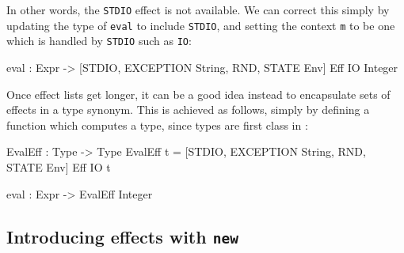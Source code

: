 \noindent
In other words, the \texttt{STDIO} effect is not available. We can correct
this simply by updating the type of \texttt{eval} to include \texttt{STDIO},
and setting the context \texttt{m} to be one which is handled by \texttt{STDIO}
such as \texttt{IO}:

\begin{code}
eval : Expr -> { [STDIO, EXCEPTION String, RND, STATE Env] } Eff IO Integer
\end{code}

\noindent
Once effect lists get longer, it can be a good idea instead
to encapsulate sets of effects in a type synonym. This is achieved as follows,
simply by defining a function which computes a type, since types are first
class in \Idris{}:

\begin{code}
EvalEff : Type -> Type
EvalEff t = { [STDIO, EXCEPTION String, RND, STATE Env] } Eff IO t
  
eval : Expr -> EvalEff Integer
\end{code}


\subsection{Introducing effects with \texttt{new}}
